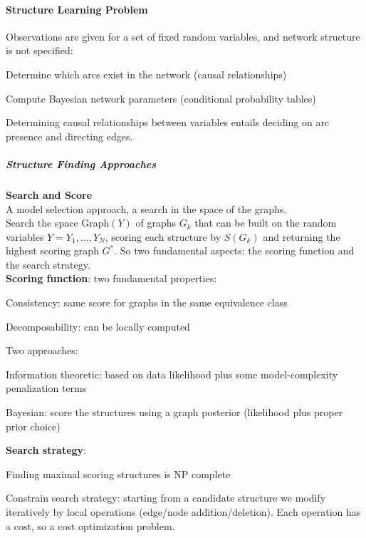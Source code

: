 \documentclass[10pt]{report}
\begin{document}
\paragraph{Structure Learning Problem} Observations are given for a set of fixed random variables, and network structure is not specified:\begin{list}{}{}
	\item Determine which arcs exist in the network (causal relationships)
	\item Compute Bayesian network parameters (conditional probability tables)
\end{list}
Determining causal relationships between variables entails deciding on arc presence and directing edges.
\subparagraph{Structure Finding Approaches}\begin{list}{}{}
	\item \textbf{Search and Score}\\A model selection approach, a search in the space of the graphs.\\
	Search the space Graph$(Y)$ of graphs $G_k$ that can be built on the random variables $Y = Y_1,\ldots,Y_N$, scoring each structure by $S(G_k)$ and returning the highest scoring graph $G^*$. So two fundamental aspects: the scoring function and the search strategy.\\
	\textbf{Scoring function}: two fundamental properties:\begin{list}{}{}
		\item Consistency: same score for graphs in the same equivalence class
		\item Decomposability: can be locally computed
	\end{list}
	Two approaches:\begin{list}{}{}
		\item Information theoretic: based on data likelihood plus some model-complexity penalization terms
		\item Bayesian: score the structures using a graph posterior (likelihood plus proper prior choice)
	\end{list}
	\textbf{Search strategy}:\begin{list}{}{}
		\item Finding maximal scoring structures is NP complete
		\item Constrain search strategy: starting from a candidate structure we modify iteratively by local operations (edge/node addition/deletion). Each operation has a cost, so a cost optimization problem.
	\end{list}

\end{list}
\end{document}

